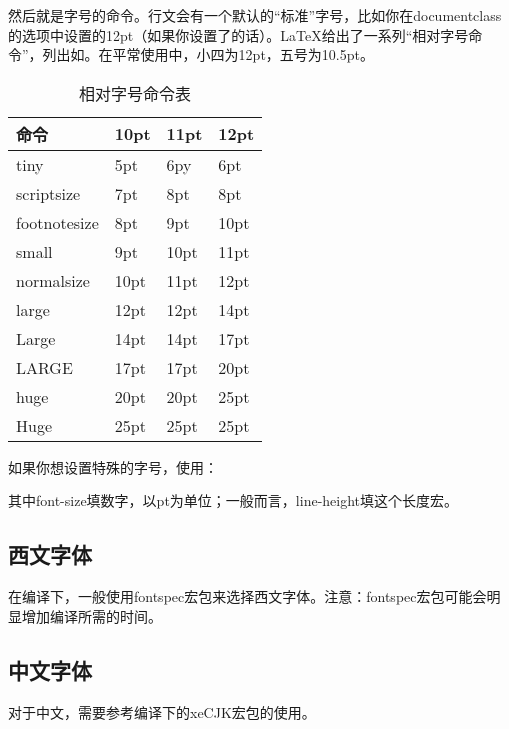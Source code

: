 {然后就是字号的命令。行文会有一个默认的“标准”字号，比如你在documentclass的选项中设置的12pt（如果你设置了的话）。\LaTeX 给出了一系列“相对字号命令”，列出如。在平常使用中，小四为12pt，五号为10.5pt。
\begin{table}[!ht]
\centering
\caption{相对字号命令表}
\label{tab:fontsize}
\begin{tabular}{|>{\ttfamily\char92}l|*{3}{l|}}
\hline
命令         & 10pt & 11pt & 12pt \\
\hline
tiny         & 5pt  & 6py  & 6pt  \\
scriptsize   & 7pt  & 8pt  & 8pt  \\
footnotesize & 8pt  & 9pt  & 10pt \\
small        & 9pt  & 10pt & 11pt \\
normalsize   & 10pt & 11pt & 12pt \\
large        & 12pt & 12pt & 14pt \\
Large        & 14pt & 14pt & 17pt \\
LARGE        & 17pt & 17pt & 20pt \\
huge         & 20pt & 20pt & 25pt \\
Huge         & 25pt & 25pt & 25pt \\
\hline
\end{tabular}
\end{table}

如果你想设置特殊的字号，使用：
\begin{latex}{}
\end{latex}

其中font-size填数字，以pt为单位；一般而言，line-height填\latexline{\\baselineskip}这个长度宏。

\subsection{西文字体}
在\xelatex 编译下，一般使用fontspec宏包来选择西文字体。注意：fontspec宏包可能会明显增加编译所需的时间。
\begin{latex}{}
\usepackage{fontspec}
\end{latex}

\subsection{中文字体}
对于中文，需要参考\xelatex 编译下的xeCJK宏包的使用。

}
